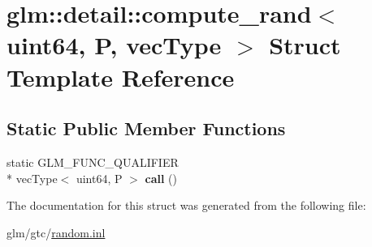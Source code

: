 \hypertarget{structglm_1_1detail_1_1compute__rand_3_01uint64_00_01P_00_01vecType_01_4}{\section{glm\-:\-:detail\-:\-:compute\-\_\-rand$<$ uint64, P, vec\-Type $>$ Struct Template Reference}
\label{structglm_1_1detail_1_1compute__rand_3_01uint64_00_01P_00_01vecType_01_4}
}
\subsection*{Static Public Member Functions}
\begin{DoxyCompactItemize}
\item 
\hypertarget{structglm_1_1detail_1_1compute__rand_3_01uint64_00_01P_00_01vecType_01_4_aaee716157dba6c26ee7bb5d176f5d68f}{static G\-L\-M\-\_\-\-F\-U\-N\-C\-\_\-\-Q\-U\-A\-L\-I\-F\-I\-E\-R \\*
vec\-Type$<$ uint64, P $>$ {\bfseries call} ()}\label{structglm_1_1detail_1_1compute__rand_3_01uint64_00_01P_00_01vecType_01_4_aaee716157dba6c26ee7bb5d176f5d68f}

\end{DoxyCompactItemize}


The documentation for this struct was generated from the following file\-:\begin{DoxyCompactItemize}
\item 
glm/gtc/\hyperlink{random_8inl}{random.\-inl}\end{DoxyCompactItemize}
